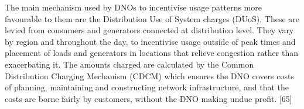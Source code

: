 \documentclass[report_18month.tex]{subfiles}
\begin{document}
The main mechanism used by DNOs to incentivise usage patterns more favourable to them are the Distribution Use of System charges (DUoS). These are levied from consumers and generators connected at distribution level. They vary by region and throughout the day, to incentivise usage outside of peak times and placement of loads and generators in locations that relieve congestion rather than exacerbating it. The amounts charged are calculated by the Common Distribution Charging Mechanism (CDCM) which ensures the DNO covers costs of planning, maintaining and constructing network infrastructure, and that the costs are borne fairly by customers, without the DNO making undue profit. [65]
\end{document}
